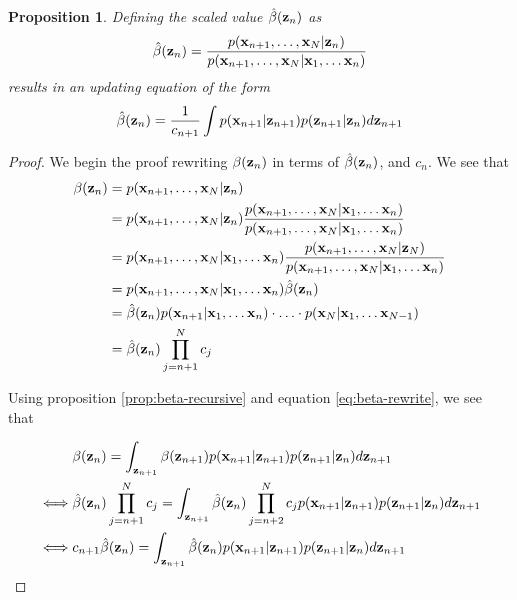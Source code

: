 \documentclass[11pt]{article}
\numberwithin{equation}{section}
\newcommand{\x}{{\bf x}}
\newcommand{\z}{{\bf z}}
\newtheorem{proposition}{Proposition}[section]
\begin{document}
\begin{proposition} \label{prop:beta-hat}
	Defining the scaled value $\hat\beta(\z_n)$ as
	\begin{equation}
		\hat\beta(\z_n) = \frac{p(\x_{n+1}, \ldots, \x_N \vert \z_n)}{p(\x_{n+1}, \ldots, \x_N \vert \x_1, \ldots \x_n)}
	\end{equation}
	results in an updating equation of the form
	\begin{equation}
		\hat\beta(\z_n) = \frac{1}{c_{n+1}}\int p(\x_{n+1}\vert\z_{n+1})p(\z_{n+1}\vert\z_n) d\z_{n+1} 
	\end{equation}
\end{proposition}

\begin{proof}
	We begin the proof rewriting $\beta(\z_n)$ in terms of $\hat\beta(\z_n)$, and $c_n$. We see that
	\begin{align}
		\beta(\z_n) &= p(\x_{n+1}, \ldots, \x_N \vert \z_n)\\
		&= p(\x_{n+1}, \ldots, \x_N \vert \z_n) \frac{p(\x_{n+1}, \ldots, \x_N \vert \x_1, \ldots \x_n)}{p(\x_{n+1}, \ldots, \x_N \vert \x_1, \ldots \x_n)} \\
		&= p(\x_{n+1}, \ldots, \x_N \vert \x_1, \ldots \x_n) \frac{p(\x_{n+1}, \ldots, \x_N \vert \z_N)}{p(\x_{n+1}, \ldots, \x_N \vert \x_1, \ldots \x_n)}\\
		&= p(\x_{n+1}, \ldots, \x_N \vert \x_1, \ldots \x_n) \hat\beta(\z_n)\\
		&= \hat\beta(\z_n) p(\x_{n+1} \vert \x_1, \ldots \x_n) \cdot \ldots \cdot p(\x_{N} \vert \x_1, \ldots \x_{N-1})\\
		&= \hat\beta(\z_n) \prod_{j=n+1}^N c_j \label{eq:beta-rewrite}
	\end{align}
	
	Using proposition \ref{prop:beta-recursive} and equation \ref{eq:beta-rewrite}, we see that
	
	\begin{align}
		&\beta(\z_n) = \int_{\z_{n+1}} \beta(\z_{n+1})p(\x_{n+1}\vert \z_{n+1}) p(\z_{n+1}\vert \z_n) d\z_{n+1}\\
		\iff& \hat\beta(\z_n) \prod_{j=n+1}^N c_j = \int_{\z_{n+1}}\hat\beta(\z_n) \prod_{j=n+2}^N c_jp(\x_{n+1}\vert \z_{n+1}) p(\z_{n+1}\vert \z_n) d\z_{n+1}\\
		\iff& c_{n+1} \hat\beta(\z_n) = \int_{\z_{n+1}} \hat\beta(\z_n) p(\x_{n+1}\vert \z_{n+1}) p(\z_{n+1}\vert \z_n) d\z_{n+1}
	\end{align}
\end{proof}
\end{document}
